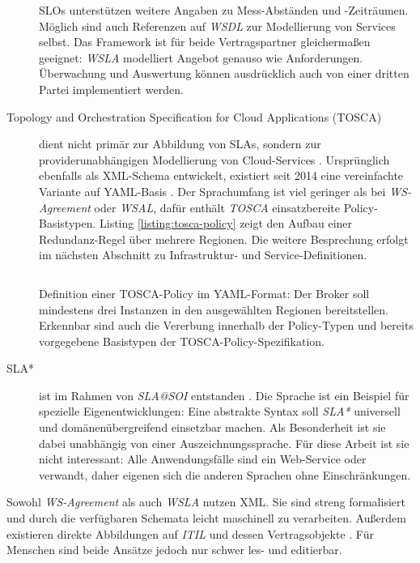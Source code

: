\begin{description}
	SLOs unterstützen weitere Angaben zu Mess-Abständen und -Zeiträumen. Möglich sind auch Referenzen auf \emph{WSDL} zur Modellierung von Services selbst. Das Framework ist für beide Vertragspartner gleichermaßen geeignet: \emph{WSLA} modelliert Angebot genauso wie Anforderungen. Überwachung und Auswertung können ausdrücklich auch von einer dritten Partei implementiert werden.

	\item[Topology and Orchestration Specification for Cloud Applications (TOSCA)] dient nicht primär zur Abbildung von SLAs, sondern zur providerunabhängigen Modellierung von Cloud-Services \cite{oasis:2013:tosca}. Ursprünglich ebenfalls als XML-Schema entwickelt, existiert seit 2014 eine vereinfachte Variante auf YAML-Basis \cite{oasis:2018:tosca-simple}. Der Sprachumfang ist viel geringer als bei \emph{WS-Agreement} oder \emph{WSAL}, dafür enthält \emph{TOSCA} einsatzbereite Policy-Basistypen. Listing \ref{listing:tosca-policy} zeigt den Aufbau einer Redundanz-Regel über mehrere Regionen. Die weitere Besprechung erfolgt im nächsten Abschnitt zu Infrastruktur- und Service-Definitionen.
		
	\begin{listing}[ht]
		\inputminted[]{yaml}{./src/TOSCA.policy.sample.yaml}
		\caption{Definition einer TOSCA-Policy im YAML-Format: Der Broker soll mindestens drei Instanzen in den ausgewählten Regionen bereitstellen. Erkennbar sind auch die Vererbung innerhalb der Policy-Typen und bereits vorgegebene Basistypen der TOSCA-Policy-Spezifikation.}
		\label{listing:tosca-policy}
	\end{listing}
	

	\item[SLA*] ist im Rahmen von \emph{SLA@SOI} entstanden \cite{kearney:2010:sla-star}. Die Sprache ist ein Beispiel für spezielle Eigenentwicklungen: Eine abstrakte Syntax soll \emph{SLA*} universell und domänenübergreifend einsetzbar machen. Als Besonderheit ist sie dabei unabhängig von einer Auszeichnungssprache. Für diese Arbeit ist sie nicht interessant: Alle Anwendungsfälle sind ein Web-Service oder verwandt, daher eigenen sich die anderen Sprachen ohne Einschränkungen.

\end{description}

\noindent
Sowohl \emph{WS-Agreement} als auch \emph{WSLA} nutzen XML. Sie sind streng formalisiert und durch die verfügbaren Schemata leicht maschinell zu verarbeiten. Außerdem existieren direkte Abbildungen auf \emph{ITIL} und dessen Vertragsobjekte \cite{koehler:2006:itil}. Für Menschen sind beide Ansätze jedoch nur schwer les- und editierbar.


